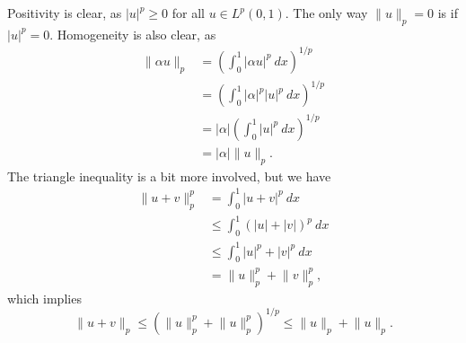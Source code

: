 \begin{solution}
    Positivity is clear, as $\lvert u \rvert^p \geq 0$ for all $u \in L^p(0, 1)$.
    The only way $\lVert u \rVert_p = 0$ is if $\lvert u \rvert^p = 0$.
    Homogeneity is also clear, as
    \begin{align*}
        \lVert \alpha u \rVert_p &= \left( \int_{0}^{1} \lvert \alpha u \rvert^p \ dx \right)^{1/p} \\
        &= \left( \int_{0}^{1} \lvert \alpha \rvert^p \lvert u \rvert^p \ dx \right)^{1/p} \\
        &= \lvert \alpha \rvert \left( \int_{0}^{1} \lvert u \rvert^p \ dx \right)^{1/p} \\
        &= \lvert \alpha \rvert \lVert u \rVert_p.
    \end{align*}
    The triangle inequality is a bit more involved, but we have
    \begin{align*}
        \lVert u + v \rVert_p^p &= \int_{0}^{1} \lvert u + v \rvert^p \ dx \\
        &\leq \int_{0}^{1} \left( \lvert u \rvert + \lvert v \rvert \right)^p \ dx \\
        &\leq \int_{0}^{1} \lvert u \rvert^p + \lvert v \rvert^p \ dx \\
        &= \lVert u \rVert_p^p + \lVert v \rVert_p^p,
    \end{align*}
    which implies
    \begin{equation*}
        \lVert u + v \rVert_p \leq \left( \lVert u \rVert_p^p + \lVert u \rVert_p^p \right)^{1/p} \leq \lVert u \rVert_p + \lVert u \rVert_p.
    \end{equation*}
\end{solution}